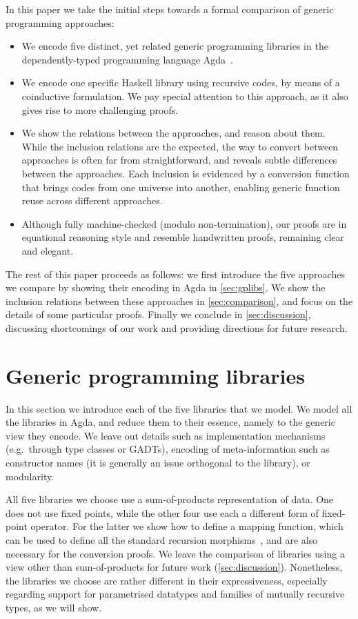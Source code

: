 \documentclass[submission,copyright,creativecommons,sharealike,noncommercial]{eptcs}
\begin{document}
In this paper we take the initial steps towards a formal comparison of
generic programming approaches:
\begin{itemize}
\item We encode five distinct, yet related generic programming libraries in
the dependently-typed programming language Agda~\cite{norell2009dependently}.

\item We encode one specific Haskell library using recursive codes, by means
of a coinductive formulation. We pay special attention to this approach, as it
also gives rise to more challenging proofs.

\item We show the relations between the approaches, and reason about them.
While the inclusion relations are the expected, the way to convert between
approaches is often far from straightforward, and reveals subtle differences
between the approaches. Each inclusion is evidenced by a conversion function
that brings codes from one universe into another, enabling generic function
reuse across different approaches.

\item Although fully machine-checked (modulo non-termination), our proofs are in
equational reasoning style and resemble handwritten proofs, remaining clear and
elegant.
\end{itemize}

The rest of this paper proceeds as follows: we first introduce the five
approaches we compare by showing their encoding in Agda in \autoref{sec:gplibs}.
We show the inclusion relations between these approaches in
\autoref{sec:comparison}, and focus on the details of some particular proofs.
Finally we conclude in \autoref{sec:discussion}, discussing shortcomings of our
work and providing directions for future research.

\section{Generic programming libraries}
\label{sec:gplibs}In this section we introduce each of the five libraries that we model.
We model all the libraries in Agda, and reduce them to their essence, namely
to the generic view they encode. We leave out details such as implementation
mechanisms (e.g.\ through type classes or GADTs), encoding of meta-information
such as constructor names (it is generally an issue orthogonal to the library),
or modularity.

All five libraries we choose use a sum-of-products representation of data.
One does not use fixed points, while the other four use each a different form of
fixed-point operator. For the latter we show how to define a mapping
function, which can be used to define all the standard recursion
morphisms~\cite{bananas}, and are also necessary for the conversion proofs.
We leave the comparison of libraries using a view
other than sum-of-products for future work (\autoref{sec:discussion}).
Nonetheless, the libraries we choose are rather different in their
expressiveness, especially regarding support for parametrised datatypes and
families of mutually recursive types, as we will show.
\end{document}
